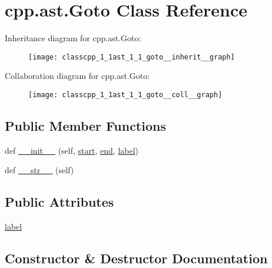 \hypertarget{classcpp_1_1ast_1_1_goto}{}\section{cpp.\+ast.\+Goto Class Reference}
\label{classcpp_1_1ast_1_1_goto}


Inheritance diagram for cpp.\+ast.\+Goto\+:
\nopagebreak
\begin{figure}[H]
\begin{center}
\leavevmode
\texttt{[image: classcpp\_1\_1ast\_1\_1\_goto\_\_inherit\_\_graph]}
\end{center}
\end{figure}


Collaboration diagram for cpp.\+ast.\+Goto\+:
\nopagebreak
\begin{figure}[H]
\begin{center}
\leavevmode
\texttt{[image: classcpp\_1\_1ast\_1\_1\_goto\_\_coll\_\_graph]}
\end{center}
\end{figure}
\subsection*{Public Member Functions}
\begin{DoxyCompactItemize}
\item 
def \hyperlink{classcpp_1_1ast_1_1_goto_a928e79374a90d01fc060985ea1e45260}{\+\_\+\+\_\+init\+\_\+\+\_\+} (self, \hyperlink{classcpp_1_1ast_1_1_node_a7b2aa97e6a049bb1a93aea48c48f1f44}{start}, \hyperlink{classcpp_1_1ast_1_1_node_a3c5e5246ccf619df28eca02e29d69647}{end}, \hyperlink{classcpp_1_1ast_1_1_goto_a685284ea5f3b21f39aff7f5db841c8f5}{label})
\item 
def \hyperlink{classcpp_1_1ast_1_1_goto_a508b6bc091cf06bfed73a33368c236c9}{\+\_\+\+\_\+str\+\_\+\+\_\+} (self)
\end{DoxyCompactItemize}
\subsection*{Public Attributes}
\begin{DoxyCompactItemize}
\item 
\hyperlink{classcpp_1_1ast_1_1_goto_a685284ea5f3b21f39aff7f5db841c8f5}{label}
\end{DoxyCompactItemize}


\subsection{Constructor \& Destructor Documentation}
